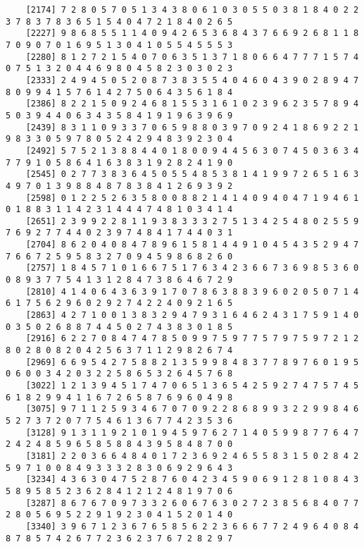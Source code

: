 \documentclass{article}
\begin{document}
\begin{itemize}
\begin{scriptsize}
\begin{verbatim}
	[2174] 7 2 8 0 5 7 0 5 1 3 4 3 8 0 6 1 0 3 0 5 5 0 3 8 1 8 4 0 2 2 3 7 8 3 7 8 3 6 5 1 5 4 0 4 7 2 1 8 4 0 2 6 5
	[2227] 9 8 6 8 5 5 1 1 4 0 9 4 2 6 5 3 6 8 4 3 7 6 6 9 2 6 8 1 1 8 7 0 9 0 7 0 1 6 9 5 1 3 0 4 1 0 5 5 4 5 5 5 3
	[2280] 8 1 2 7 2 1 5 4 0 7 0 6 3 5 1 3 7 1 8 0 6 6 4 7 7 7 1 5 7 4 0 7 5 1 3 2 0 4 4 6 9 8 0 4 5 8 2 3 0 3 0 2 3
	[2333] 2 4 9 4 5 0 5 2 0 8 7 3 8 3 5 5 4 0 4 6 0 4 3 9 0 2 8 9 4 7 8 0 9 9 4 1 5 7 6 1 4 2 7 5 0 6 4 3 5 6 1 8 4
	[2386] 8 2 2 1 5 0 9 2 4 6 8 1 5 5 3 1 6 1 0 2 3 9 6 2 3 5 7 8 9 4 5 0 3 9 4 4 0 6 3 4 3 5 8 4 1 9 1 9 6 3 9 6 9
	[2439] 8 3 1 1 0 9 3 3 7 0 6 5 9 8 8 0 3 9 7 0 9 2 4 1 8 6 9 2 2 1 9 8 3 3 0 5 9 7 8 0 5 2 4 2 9 4 8 3 9 2 3 0 4
	[2492] 5 7 5 2 1 3 8 8 4 4 0 1 8 0 0 9 4 4 5 6 3 0 7 4 5 0 3 6 3 4 7 7 9 1 0 5 8 6 4 1 6 3 8 3 1 9 2 8 2 4 1 9 0
	[2545] 0 2 7 7 3 8 3 6 4 5 0 5 5 4 8 5 3 8 1 4 1 9 9 7 2 6 5 1 6 3 4 9 7 0 1 3 9 8 8 4 8 7 8 3 8 4 1 2 6 9 3 9 2
	[2598] 0 1 2 2 5 2 6 3 5 8 0 0 8 8 2 1 4 1 4 0 9 4 0 4 7 1 9 4 6 1 0 1 8 8 3 1 1 4 2 3 1 4 4 4 7 4 8 1 0 3 4 1 4
	[2651] 2 3 9 9 2 2 8 1 1 9 3 8 3 3 3 2 7 5 1 3 4 2 5 4 8 0 2 5 5 9 7 6 9 2 7 7 4 4 0 2 3 9 7 4 8 4 1 7 4 4 0 3 1
	[2704] 8 6 2 0 4 0 8 4 7 8 9 6 1 5 8 1 4 4 9 1 0 4 5 4 3 5 2 9 4 7 7 6 6 7 2 5 9 5 8 3 2 7 0 9 4 5 9 8 6 8 2 6 0
	[2757] 1 8 4 5 7 1 0 1 6 6 7 5 1 7 6 3 4 2 3 6 6 7 3 6 9 8 5 3 6 0 0 8 9 3 7 7 5 4 1 3 1 2 8 4 7 3 8 6 4 6 7 2 9
	[2810] 4 1 4 0 6 4 3 6 3 9 1 7 0 7 8 6 3 8 8 3 9 6 0 2 0 5 0 7 1 4 6 1 7 5 6 2 9 6 0 2 9 2 7 4 2 2 4 0 9 2 1 6 5
	[2863] 4 2 7 1 0 0 1 3 8 3 2 9 4 7 9 3 1 6 4 6 2 4 3 1 7 5 9 1 4 0 0 3 5 0 2 6 8 8 7 4 4 5 0 2 7 4 3 8 3 0 1 8 5
	[2916] 6 2 2 7 0 8 4 7 4 7 8 5 0 9 9 7 5 9 7 7 5 7 9 7 5 9 7 2 1 2 8 0 2 8 0 8 2 0 4 2 5 6 3 7 1 1 2 9 8 2 6 7 4
	[2969] 6 6 9 5 4 2 7 5 8 8 2 1 3 5 9 9 8 4 8 3 7 7 8 9 7 6 0 1 9 5 0 6 0 0 3 4 2 0 3 2 2 5 8 6 5 3 2 6 4 5 7 6 8
	[3022] 1 2 1 3 9 4 5 1 7 4 7 0 6 5 1 3 6 5 4 2 5 9 2 7 4 7 5 7 4 5 6 1 8 2 9 9 4 1 1 6 7 2 6 5 8 7 6 9 6 0 4 9 8
	[3075] 9 7 1 1 2 5 9 3 4 6 7 0 7 0 9 2 2 8 6 8 9 9 3 2 2 9 9 8 4 6 5 2 7 3 7 2 0 7 7 5 4 6 1 3 6 7 7 4 2 3 5 3 6
	[3128] 9 1 3 1 1 9 2 1 0 1 9 4 5 9 7 6 2 7 1 4 0 5 9 9 8 7 7 6 4 7 2 4 2 4 8 5 9 6 5 8 5 8 8 4 3 9 5 8 4 8 7 0 0
	[3181] 2 2 0 3 6 6 4 8 4 0 1 7 2 3 6 9 2 4 6 5 5 8 3 1 5 0 2 8 4 2 5 9 7 1 0 0 8 4 9 3 3 3 2 8 3 0 6 9 2 9 6 4 3
	[3234] 4 3 6 3 0 4 7 5 2 8 7 6 0 4 2 3 4 5 9 0 6 9 1 2 8 1 0 8 4 3 5 8 9 5 8 5 2 3 6 2 8 4 1 2 1 2 4 8 1 9 7 0 6
	[3287] 8 6 7 6 7 0 9 7 3 3 2 6 0 6 7 6 3 0 2 7 2 3 8 5 6 8 4 0 7 7 2 8 0 5 6 9 5 2 2 9 1 9 2 3 0 4 1 5 2 0 1 4 0
	[3340] 3 9 6 7 1 2 3 6 7 6 5 8 5 6 2 2 3 6 6 6 7 7 2 4 9 6 4 0 8 4 8 7 8 5 7 4 2 6 7 7 2 3 6 2 3 7 6 7 2 8 2 9 7

\end{verbatim}
\end{scriptsize}
\end{itemize}
\end{document}
